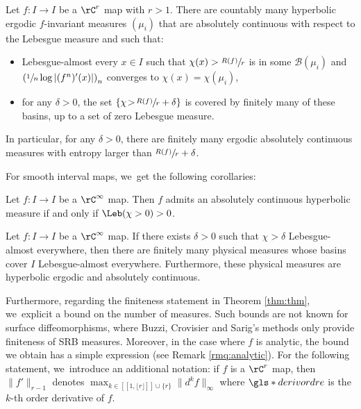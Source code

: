 \begin{thmtitle}
\label{thm:thm}
Let $f : I \to I$ be a $\rC^r$ map with $r > 1$.
There are countably many hyperbolic ergodic $f$\nobreakdash-invariant measures $(\mu_i)$ that are absolutely continuous with respect to the Lebesgue measure and such that:
\begin{itemize}
\item
Lebesgue-almost every $x \in I$ such that $\chi(x) > \sfrac{R(f)}{r}$ is in some $\mathcal{B}(\mu_i)$ and $\left (\sfrac{1}{n} \log |(f^n)'(x)| \right)_n$ converges to $\chi(x) = \chi(\mu_i)$,

\item
for any $\delta \!>\! 0$, the set $\left \{ \chi \!>\! \sfrac{R(f)}{r} + \delta \right \}$ is covered by finitely many of these basins, up to a set of zero Lebesgue measure.
\end{itemize}
In particular, for any $\delta > 0$, there are finitely many ergodic absolutely continuous measures with entropy larger than $\sfrac{R(f)}{r} + \delta$.
\end{thmtitle}

For smooth interval maps, we~get the following corollaries:

\begin{cortitle}
\label{cor:title}
Let $f : I \to I$ be a $\rC^{\infty}$ map.
Then $f$ admits an absolutely continuous hyperbolic measure if and only if $\Leb(\chi > 0) > 0$.
\end{cortitle}

\begin{cortitle}
\label{cor:title2}
Let $f : I \to I$ be a $\rC^{\infty}$ map. If there exists $\delta > 0$ such that $\chi > \delta$ Lebesgue-almost everywhere, then there are finitely many physical measures whose basins cover $I$ Lebesgue-almost everywhere.
Furthermore, these physical measures are hyperbolic ergodic and absolutely continuous.
\end{cortitle}

Furthermore, regarding the finiteness statement in Theorem \ref{thm:thm}, we~explicit a bound on the number of measures.
Such bounds are not known for surface diffeomorphisms, where Buzzi, Crovisier and Sarig's methods \cite{BCS_mme} only provide finiteness of SRB measures. Moreover, in the case where $f$ is analytic, the bound we obtain has a simple expression (see Remark \ref{rmq:analytic}).
For the following statement, we~introduce an additional notation: if $f$ is a $\rC^r$ map, then $\| f' \|_{r-1}$ denotes $\max_{k \in [\![ 1, \lfloor r \rfloor ]\!] \cup \{ r \}} \| d^k f \|_{\infty}$ where $\gls*{derivordre}$ is the $k$-th order derivative of $f$.

